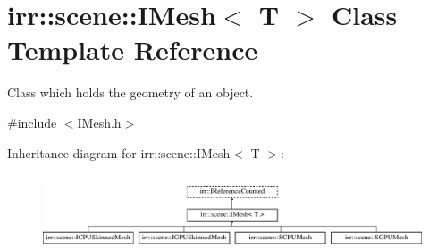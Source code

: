 \hypertarget{classirr_1_1scene_1_1IMesh}{}\section{irr\+:\+:scene\+:\+:I\+Mesh$<$ T $>$ Class Template Reference}
\label{classirr_1_1scene_1_1IMesh}


Class which holds the geometry of an object.  




{\ttfamily \#include $<$I\+Mesh.\+h$>$}

Inheritance diagram for irr\+:\+:scene\+:\+:I\+Mesh$<$ T $>$\+:\begin{figure}[H]
\begin{center}
\leavevmode
\includegraphics[height=2.295082cm]{classirr_1_1scene_1_1IMesh}
\end{center}
\end{figure}
